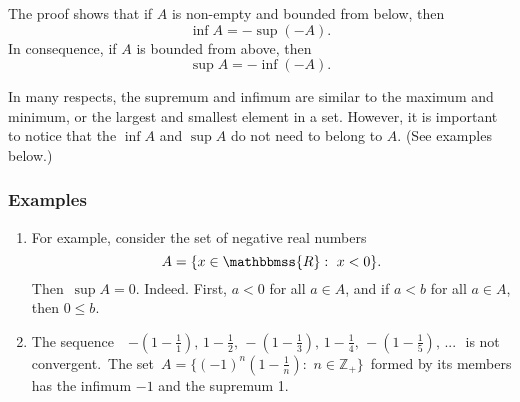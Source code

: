 \documentclass[12pt]{article}
\newcommand{\R}{\mathbbmss{R}}
\begin{document}
The proof shows that if $A$ is non-empty and bounded from below, 
then 
$$
  \inf A = -\sup (-A).
$$
In consequence, if $A$ is bounded from above, 
then 
$$
  \sup A = -\inf (-A).
$$

In many respects, the supremum and infimum are similar to the maximum
and minimum, or the largest and smallest element in a set. 
However, it is important to notice that the $\inf A$ and $\sup A$
do not need to belong to $A$. (See examples below.)

\subsubsection*{Examples}
\begin{enumerate}

\item 
For example, consider the set of negative real numbers
$$
  A = \{ x\in \R:\,\, x<0\}.
$$
Then\, $\sup A = 0$. Indeed. First, $a < 0$ for all $a \in A$, 
and if $a < b$ for all $a \in A$, then $0 \le b$. 

\item The sequence \,\,
$-(1\!-\!\frac{1}{1}),\,1\!-\!\frac{1}{2},\,-(1\!-\!\frac{1}{3}),\, 1\!-\!\frac{1}{4},\,-(1\!-\!\frac{1}{5}),\,...$\,\,
is not convergent.\, The set\, $A = \{(-1)^n(1-\frac{1}{n}):\,\, n\in\mathbb{Z}_+\}$\, formed by its members has the infimum $-1$ and the supremum 1.

\end{enumerate}
\end{document}
